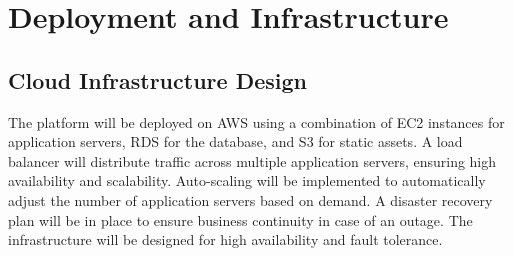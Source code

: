 \documentclass[11pt,a4paper,oneside]{article}
\begin{document}
\section{Deployment and Infrastructure}

\subsection{Cloud Infrastructure Design}

The platform will be deployed on AWS using a combination of EC2 instances for application servers, RDS for the database, and S3 for static assets.  A load balancer will distribute traffic across multiple application servers, ensuring high availability and scalability.  Auto-scaling will be implemented to automatically adjust the number of application servers based on demand.  A disaster recovery plan will be in place to ensure business continuity in case of an outage.  The infrastructure will be designed for high availability and fault tolerance.
\end{document}
